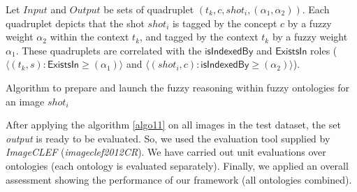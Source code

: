 		Let $Input$ and $Output$ be sets of quadruplet $(t_{k},c,shot_{i},(\alpha_{1}, \alpha_{2}))$. 
		Each quadruplet depicts that the shot 
		$shot_{i}$ is tagged by the concept $c$ by a fuzzy weight $\alpha_{2}$ within the context $t_{k}$,
		and tagged by the context $t_{k}$ by a fuzzy weight $\alpha_{1}$.
		These quadruplets are correlated 
		with the $\mathsf{isIndexedBy}$ and $\mathsf{ExistsIn}$ roles ($\langle(t_{k},s): 
		\mathsf{ExistsIn} \geqslant (\alpha_{1})\rangle$ and $\langle(shot_{i},c) : \mathsf{isIndexedBy} 
		\geqslant (\alpha_{2})\rangle$).

		\begin{algorithm}
			\label{algo11}
			\SetAlgoLined
			\caption{Algorithm to prepare and launch the fuzzy reasoning within fuzzy 
			ontologies for an image $shot_{i}$}
		\end{algorithm}

		After applying the algorithm \ref{algo11} on all images in the test dataset, the set 
		\emph{output} is ready to be evaluated. So, we used the evaluation tool supplied by \emph{ImageCLEF}
		(\emph{imageclef2012CR}). We have carried out unit evaluations over ontologies 
		(each ontology is evaluated separately). Finally, we applied an overall assessment showing 
		the performance of our framework (all ontologies combined).



